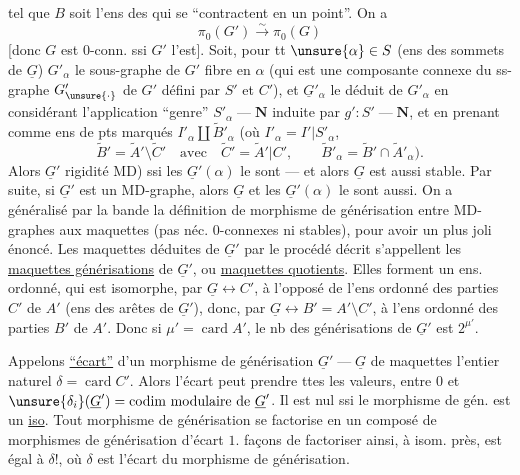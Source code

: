 tel que $B$ soit l'ens des   qui se ``contractent en un point''. On a
\[
\pi_0(G')\overset{\sim}{\longrightarrow}\pi_0(G)
\]
[donc $G$ est $0$-conn. ssi $G'$ l'est].  Soit, pour tt $\unsure{\alpha}\in S$ (ens des sommets de $\underline{G}$) $G'_\alpha$ le sous-graphe de $G'$ fibre en $\alpha$ (qui est une composante connexe du ss-graphe $G'_{\unsure{\cdot}}$ de $G'$ défini par $S'$ et $C'$), et $\underline{G}'_\alpha$ le  déduit de $G'_\alpha$ en considérant l'application ``genre'' $S'_\alpha\mathbin{\text{---}}\mathbf{N}$ induite par $g':S'\mathbin{\text{---}}\mathbf{N}$, et en prenant comme ens de pts marqués $I'_\alpha\amalg\widetilde{B}'_\alpha$ (où $I'_\alpha=I'|S'_\alpha$,
\[
\widetilde{B}'=\widetilde{A}'\setminus\widetilde{C}'\quad\text{avec}\quad
\widetilde{C}'=\widetilde{A}'|C',\qquad
\widetilde{B}'_\alpha=\widetilde{B}'\cap\widetilde{A}'_\alpha).
\]
Alors $\underline{G}'$   rigidité MD) ssi les $\underline{G}'(\alpha)$ le sont --- et alors $\underline{G}$ est aussi stable. Par suite, si $\underline{G}'$ est un MD-graphe, alors $\underline{G}$ et les $\underline{G}'(\alpha)$ le sont aussi.
\uline{} On a généralisé par la bande la définition de morphisme de générisation entre MD-graphes aux maquettes (pas néc. $0$-connexes ni stables), pour avoir un plus joli énoncé. Les maquettes déduites de $\underline{G}'$ par le procédé décrit s'appellent les \uline{maquettes générisations} de $\underline{G}'$, ou \uline{maquettes quotients}. Elles forment un ens. ordonné, qui est isomorphe, par $\underline{G}\longleftrightarrow C'$, à l'opposé de l'ens ordonné des parties $C'$ de $A'$ (ens des arêtes de $\underline{G}'$), donc, par $\underline{G}\longleftrightarrow B'=A'\setminus C'$, à l'ens ordonné des parties $B'$ de $A'$. Donc si $\mu'=\operatorname{card}A'$, le nb des générisations de $\underline{G}'$ est $2^{\mu'}$.

Appelons \uline{``écart''} d'un morphisme de générisation $\underline{G}'\mathbin{\text{---}}\underline{G}$ de maquettes l'entier naturel $\delta=\operatorname{card}C'$. Alors l'écart     peut prendre ttes les valeurs, entre $0$ et $\unsure{\delta_i}(\underline{G}')=\text{codim modulaire de }\underline{G}'$. Il est nul ssi le morphisme de gén. est un \uline{iso}.
Tout morphisme de générisation se factorise en un composé de morphismes de générisation d'écart $1$.   façons de factoriser ainsi, à isom. près, est égal à $\delta!$, où $\delta$ est l'écart du morphisme de générisation.

